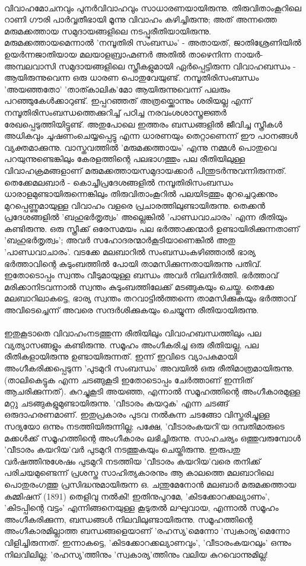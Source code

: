 \paragraph{}വിവാഹമോചനവും പുനർവിവാഹവും സാധാരണയായിരുന്നു. തിരുവിതാംകൂറിലെ റാണി ഗൗരി പാർവ്വതീഭായി മൂന്നു വിവാഹം കഴിച്ചിരുന്നു; അത് അന്നത്തെ മരുമക്കത്തായ സമുദായങ്ങളിലെ നടപ്പുരീതിയായിരുന്നു. മരുമക്കത്തായമെന്നാൽ 'നമ്പൂതിരി സംബന്ധം' - അതായത്, ജാതിശ്രേണിയിൽ ഉയർന്നജാതിയായ മലയാളബ്രാഹ്മണർ അതിൽ താഴെനിന്ന നായർ-അമ്പലവാസി സമുദായങ്ങളിലെ സ്ത്രീകളുമായി ഏർപ്പെട്ടിരുന്ന വിവാഹബന്ധം - ആയിരുന്നുവെന്ന ഒരു ധാരണ പൊതുവേയുണ്ട്. നമ്പൂതിരിസംബന്ധം 'അയഞ്ഞതോ' 'താത്കാലിക'മോ ആയിരുന്നുവെന്ന് പലരും പറഞ്ഞുകേൾക്കാറുണ്ട്. ഇപ്പറഞ്ഞത് അത്രയ്ക്കൊന്നും ശരിയല്ല എന്ന് നമ്പൂതിരിസംബന്ധത്തെക്കുറിച്ച് പഠിച്ച നരവംശശാസ്ത്രജ്ഞർ രേഖപ്പെടുത്തിയിട്ടുണ്ട്. അതുപോലെ ഇത്തരം ബന്ധങ്ങളിൽ ജീവിച്ച സ്ത്രീകൾ അധികവും ചൂഷണംചെയ്യപ്പെട്ടു എന്ന ധാരണയും തെറ്റാണെന്ന് ഈ പഠനങ്ങൾ വ്യക്തമാക്കുന്നു. വാസ്തവത്തിൽ 'മരുമക്കത്തായം' എന്നു നമ്മൾ പൊതുവെ പറയുന്നുണ്ടെങ്കിലും കേരളത്തിന്റെ പലഭാഗത്തും പല രീതിയിലുള്ള വിവാഹക്രമങ്ങളാണ് മരുമക്കത്തായസമുദായക്കാർ പിന്തുടർന്നുവന്നിരുന്നത്. തെക്കേമലബാർ - കൊച്ചീപ്രദേശങ്ങളിൽ നമ്പൂതിരിസംബന്ധം ധാരാളമുണ്ടായിരുന്നെങ്കിലും തിരുവിതാംകൂറിൽ പലയിടത്തും മുറച്ചെറുക്കനും മുറപ്പെണ്ണുമായുള്ള വിവാഹം വളരെ പ്രചാരത്തിലുണ്ടായിരുന്നു. തെക്കൻ പ്രദേശങ്ങളിൽ 'ബഹുഭർതൃത്വം' അല്ലെങ്കിൽ 'പാണ്ഡവാചാരം' എന്ന രീതിയും കണ്ടിരുന്നു. ഒരു സ്ത്രീക്ക് ഒരേസമയം പല ഭർത്താക്കന്മാർ ഉണ്ടായിരിക്കുന്നതാണ് 'ബഹുഭർതൃത്വം'; അവർ സഹോദരന്മാർകൂടിയാണെങ്കിൽ അതു 'പാണ്ഡവാചാരം'. വടക്കേ മലബാറിൽ സംബന്ധംകഴിഞ്ഞാൽ ഭാര്യ ഭർത്താവിന്റെ കുടുംബത്തിൽ പോയി താമസിക്കുന്നതായിരുന്നു പതിവ്. ഇതോടൊപ്പം സ്വന്തം വീടുമായുള്ള ബന്ധം അവർ നിലനിർത്തി. ഭർത്താവ് മരിക്കാനിടവന്നാൽ സ്വന്തം കുടുംബത്തിലേക്ക് മടങ്ങുകയും ചെയ്തു. തെക്കേ മലബാറിലാകട്ടെ, ഭാര്യ സ്വന്തം തറവാട്ടിൽത്തന്നെ താമസിക്കുകയും ഭർത്താവ് അവിടെച്ചെന്ന് അവരെ സന്ദർശിക്കുകയും ചെയ്യുന്ന രീതിയായിരുന്നു.

\paragraph{}ഇതുകൂടാതെ വിവാഹംനടത്തുന്ന രീതിയിലും വിവാഹബന്ധത്തിലും പല വ്യത്യാസങ്ങളും കണ്ടിരുന്നു. സമൂഹം അംഗീകരിച്ച ഒരു രീതിയല്ല, പല രീതികളായിരുന്നു ഉണ്ടായിരുന്നത്. ഇന്ന് ഇവിടെ വ്യാപകമായി അംഗീകരിക്കപ്പെടുന്ന 'പുടമുറി സംബന്ധം' അവയിൽ ഒരു രീതിമാത്രമായിരുന്നു. (താലികെട്ടുക എന്ന ചടങ്ങുകൂടി ഇതോടൊപ്പം ചേർത്താണ് ഇന്നിത് ആചരിക്കുന്നത്). കുറച്ചുകൂടി അയഞ്ഞ, എന്നാൽ സമൂഹത്തിന്റെ അംഗീകാരമുള്ള മറ്റു ചടങ്ങുകളുമുണ്ടായിരുന്നു. 'വീടാരം കയറുക' എന്ന ചടങ്ങ് ഒരുദാഹരണമാണ്. ഇതുപ്രകാരം പുടവ നൽകുന്ന ചടങ്ങോ വിസ്തരിച്ചുള്ള സദ്യയോ ഒന്നും നടത്തിയിരുന്നില്ല; പക്ഷേ, 'വീടാരംകയറി'യ ദമ്പതിമാരുടെ മക്കൾക്ക് സമൂഹത്തിന്റെ അംഗീകാരം ലഭിച്ചിരുന്നു. സാഹചര്യം ഒത്തുവരുമ്പോൾ 'വീടാരം കയറിയ'വർ പുടമുറി നടത്തുകയും ചെയ്തിരുന്നു. ഇരുപതു വർഷത്തിനുശേഷം പുടമുറി നടത്തിയ 'വീടാരം കയറിയ'വരെ തനിക്ക് പരിചയമുണ്ടെന്ന് പ്രശസ്ത സാഹിത്യകാരനും ആ കാലത്തെ മലബാറിലെ പൊതുരംഗത്തു പ്രസിദ്ധനുമായിരുന്ന ഒ. ചന്തുമേനോൻ മലബാർ മരുമക്കത്തായ കമ്മിഷന് (1891) തെളിവു നൽകി! ഇതിനുപുറമേ, 'കിടക്കോറക്കല്യാണം', 'കിടപ്പിന്റെ വട്ടം' എന്നിങ്ങനെയുള്ള കൂടുതൽ ലഘുവായ, എന്നാൽ സമൂഹം അംഗീകരിക്കുന്ന, ബന്ധങ്ങൾ നിലവിലുണ്ടായിരുന്നു. സമൂഹത്തിന്റെ അംഗീകാരമില്ലാത്ത ബന്ധങ്ങളെയാണ് 'രഹസ്യ'മെന്നോ 'സ്വകാര്യ'മെന്നോ വിളിച്ചിരുന്നത്. ഇന്നാകട്ടെ, 'കിടക്കോറക്കല്യാണവും', 'വീടാരംകയറലും' ഒന്നും നിലവിലില്ല; 'രഹസ്യ'ത്തിനും 'സ്വകാര്യ'ത്തിനും വലിയ കുറവൊന്നുമില്ല!


